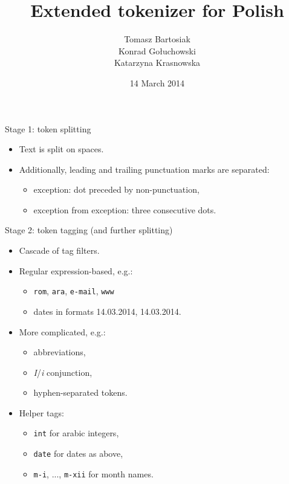 \documentclass[12pt]{beamer}
\title{Extended tokenizer for Polish}
\author{Tomasz Bartosiak \\ Konrad Gołuchowski \\ Katarzyna Krasnowska}
\date{14 March 2014}
\begin{document}
\begin{frame}
    \titlepage
\end{frame}
\begin{frame}{Stage 1: token splitting}
    \begin{itemize}
        \item Text is split on spaces.
        \item Additionally, leading and trailing punctuation marks are separated:
            \begin{itemize}
                \item exception: dot preceded by non-punctuation,
                \item exception from exception: three consecutive dots.
            \end{itemize} 
    \end{itemize}
\end{frame}
\begin{frame}{Stage 2: token tagging (and further splitting)}
    \begin{itemize}
        \item Cascade of tag filters.
        \item Regular expression-based, e.g.:
            \begin{itemize}
                \item \texttt{rom}, \texttt{ara}, \texttt{e-mail}, \texttt{www}
                \item dates in formats 14.03.2014, 14.03.2014.
            \end{itemize}
        \item More complicated, e.g.:
            \begin{itemize}
                \item abbreviations,
                \item \textit{I}/\textit{i} conjunction,
                \item hyphen-separated tokens.
            \end{itemize}
        \item Helper tags:
            \begin{itemize}
                \item \texttt{int} for arabic integers,
                \item \texttt{date} for dates as above,
                \item \texttt{m-i}, ..., \texttt{m-xii} for month names.
            \end{itemize}
    \end{itemize}
\end{frame}
\end{document}

